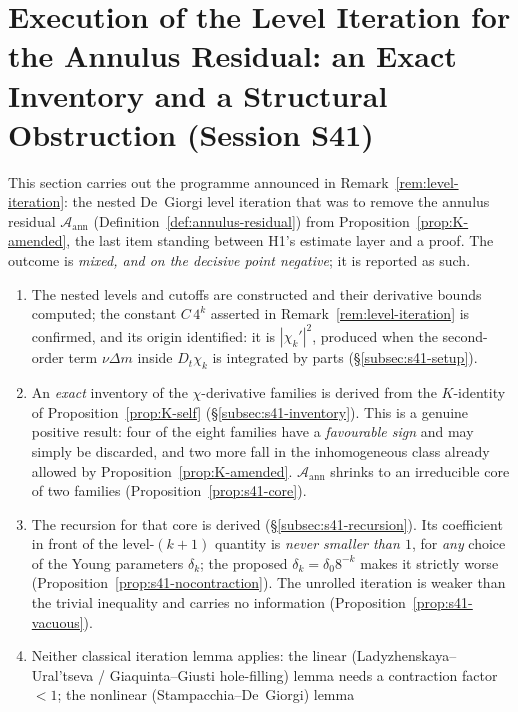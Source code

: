 \documentclass[11pt]{article}
\theoremstyle{definition}
\theoremstyle{remark}
\begin{document}
\section{Execution of the Level Iteration for the Annulus Residual:
an Exact Inventory and a Structural Obstruction (Session S41)}
\label{sec:annulus-s41}

This section carries out the programme announced in
Remark~\ref{rem:level-iteration}: the nested De~Giorgi level iteration that
was to remove the annulus residual $\mathcal{A}_{\mathrm{ann}}$
(Definition~\ref{def:annulus-residual}) from
Proposition~\ref{prop:K-amended}, the last item standing between H1's
estimate layer and a proof. The outcome is \emph{mixed, and on the decisive
point negative}; it is reported as such.

\begin{enumerate}[label=(\alph*)]
  \item The nested levels and cutoffs are constructed and their derivative
    bounds computed; the constant $C\,4^{k}$ asserted in
    Remark~\ref{rem:level-iteration} is confirmed, and its origin
    identified: it is $|\chi_k'|^2$, produced when the second-order term
    $\nu\Delta m$ inside $D_t\chi_k$ is integrated by parts
    (\S\ref{subsec:s41-setup}).
  \item An \emph{exact} inventory of the $\chi$-derivative families is
    derived from the $K$-identity of Proposition~\ref{prop:K-self}
    (\S\ref{subsec:s41-inventory}). This is a genuine positive result: four
    of the eight families have a \emph{favourable sign} and may simply be
    discarded, and two more fall in the inhomogeneous class already allowed
    by Proposition~\ref{prop:K-amended}. $\mathcal{A}_{\mathrm{ann}}$
    shrinks to an irreducible core of two families
    (Proposition~\ref{prop:s41-core}).
  \item The recursion for that core is derived
    (\S\ref{subsec:s41-recursion}). Its coefficient in front of the
    level-$(k+1)$ quantity is \emph{never smaller than $1$}, for
    \emph{any} choice of the Young parameters $\delta_k$; the proposed
    $\delta_k=\delta_0 8^{-k}$ makes it strictly worse
    (Proposition~\ref{prop:s41-nocontraction}). The unrolled iteration is
    weaker than the trivial inequality and carries no information
    (Proposition~\ref{prop:s41-vacuous}).
  \item Neither classical iteration lemma applies: the linear
    (Ladyzhenskaya--Ural'tseva / Giaquinta--Giusti hole-filling) lemma needs
    a contraction factor $<1$; the nonlinear (Stampacchia--De~Giorgi) lemma

\end{enumerate}
\end{document}
